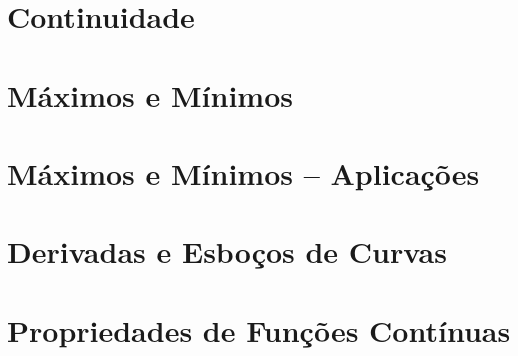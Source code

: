 \section{Continuidade}
\label{sec:continuity}

\section{Máximos e Mínimos}
\label{sec:maxmin}

\section{Máximos e Mínimos -- Aplicações}
\label{sec:maxminappl}

\section{Derivadas e Esboços de Curvas}
\label{sec:derivsketch}

\section{Propriedades de Funções Contínuas}
\label{sec:propcont}

\begin{chapterproblems}
\end{chapterproblems}
